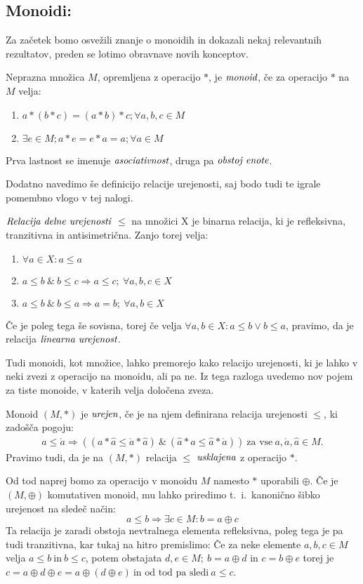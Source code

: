\documentclass[mat1]{fmfdelo}
\newcommand{\pojem}[1]{\ensuremath{\emph{#1}}}
\begin{document}
\subsection{Monoidi:}
Za začetek bomo osvežili znanje o monoidih in dokazali nekaj relevantnih rezultatov, preden se lotimo obravnave novih konceptov. 
\begin{definicija}
	Neprazna množica $M$, opremljena z operacijo $\ast$, je \pojem{monoid}, če za operacijo $\ast$ na $M$ velja:
	\begin{enumerate}
		\item $a \ast (b \ast c) = (a\ast b) \ast c;\forall a, b, c \in M$
		\item $\exists e\in M; a \ast e = e\ast a = a;\forall a\in M$
	\end{enumerate}
	Prva lastnost se imenuje \pojem{asociativnost}, druga pa \pojem{obstoj enote}. 
\end{definicija}
Dodatno navedimo še definicijo relacije urejenosti, saj bodo tudi te igrale pomembno vlogo v tej nalogi.
\begin{definicija}
	\pojem{Relacija delne urejenosti} $\leq$ na množici X je binarna relacija, ki je refleksivna, tranzitivna in antisimetrična. Zanjo torej velja:
	\begin{enumerate}
		\item $\forall a \in X: a \leq a$
		\item $a\leq b~\&~b\leq c \Rightarrow a\leq c;~\forall a, b, c\in X$
		\item $a\leq b~\&~b\leq a \Rightarrow a = b;~\forall a, b\in X$
	\end{enumerate}
Če je poleg tega še sovisna, torej če velja $\forall a, b \in X: a \leq b \lor b \leq a$, pravimo, da je relacija \pojem{linearna urejenost}.
\end{definicija}
Tudi monoidi, kot množice, lahko premorejo kako relacijo urejenosti, ki je lahko v neki zvezi z operacijo na monoidu, ali pa ne. Iz tega razloga uvedemo nov pojem za tiste monoide, v katerih velja določena zveza.
\begin{definicija}
	Monoid $(M, \ast)$ je \pojem{urejen}, če je na njem definirana relacija urejenosti $\leq$, ki zadošča pogoju: \begin{align*} 
	a \leq \acute{a} \Rightarrow ((a \ast \hat{a} \leq \acute{a} \ast \hat{a})~\&~(\hat{a} \ast a \leq \hat{a}\ast \acute{a})) ~\text{za vse}~a, \acute{a},\hat{a}\in M.
\end{align*}
	Pravimo tudi, da je na $(M, \ast)$ relacija $\leq$ \pojem{usklajena} z operacijo $\ast$.
\end{definicija}
Od tod naprej bomo za operacijo v monoidu $M$ namesto $\ast$ uporabili $\oplus$.
Če je $(M, \oplus)$ komutativen monoid, mu lahko priredimo t.~i.~kanonično šibko urejenost na sledeč način: $$a \leq b \Rightarrow \exists c\in M: b = a \oplus c$$ Ta relacija je zaradi obstoja nevtralnega elementa refleksivna, poleg tega je pa tudi tranzitivna, kar tukaj na hitro premislimo: Če za neke elemente $a, b, c\in M$ velja $a\leq b~\text{in}~b\leq c$, potem obstajata $d, e\in M;~b = a \oplus d$ in $c = b\oplus e$ torej je $c = a\oplus d\oplus e = a\oplus (d \oplus e)~\text{in od tod pa sledi}~ a \leq c$.
	
\end{document}
